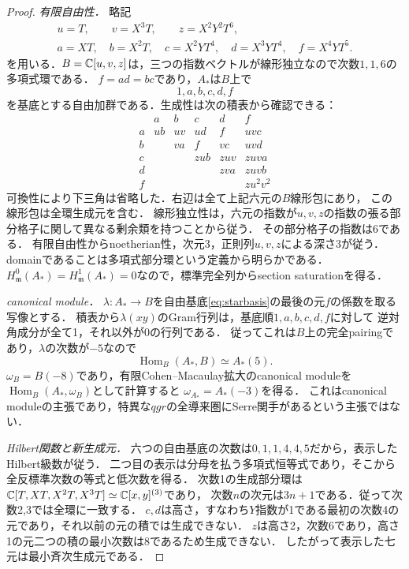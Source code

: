 \documentclass[11pt,a4paper]{ltjsarticle}
\begin{document}
\begin{proof}
\emph{有限自由性．}
略記
\[
 \begin{gathered}
 u=T,\qquad v=X^3T,\qquad z=X^2Y^2T^6,\\
 a=XT,\quad b=X^2T,\quad c=X^2YT^4,\quad d=X^3YT^4,\quad f=X^4YT^5.
 \end{gathered}
\]
を用いる．$B=\mathbb C[u,v,z]$は，三つの指数ベクトルが線形独立なので次数$1,1,6$の多項式環である．
$f=ad=bc$であり，$A_*$は$B$上で
\begin{equation}\label{eq:starbasis}
 1,a,b,c,d,f
\end{equation}
を基底とする自由加群である．生成性は次の積表から確認できる：
\[
\begin{array}{c|ccccc}
 &a&b&c&d&f\\\hline
 a&ub&uv&ud&f&uvc\\
 b&&va&f&vc&uvd\\
 c&&&zub&zuv&zuva\\
 d&&&&zva&zuvb\\
 f&&&&&zu^2v^2
\end{array}
\]
可換性により下三角は省略した．右辺は全て上記六元の$B$線形包にあり，
この線形包は全環生成元を含む．
線形独立性は，六元の指数が$u,v,z$の指数の張る部分格子に関して異なる剰余類を持つことから従う．
その部分格子の指数は6である．
有限自由性からnoetherian性，次元3，正則列$u,v,z$による深さ3が従う．
domainであることは多項式部分環という定義から明らかである．
$H^0_{\mathfrak m}(A_*)=H^1_{\mathfrak m}(A_*)=0$なので，標準完全列からsection saturationを得る．

\emph{canonical module．}
$\lambda:A_*\to B$を自由基底\eqref{eq:starbasis}の最後の元$f$の係数を取る写像とする．
積表から$\lambda(xy)$のGram行列は，基底順$1,a,b,c,d,f$に対して
逆対角成分が全て1，それ以外が0の行列である．
従ってこれは$B$上の完全pairingであり，$\lambda$の次数が$-5$なので
\[
 \operatorname{Hom}_B(A_*,B)\simeq A_*(5).
\]
$\omega_B=B(-8)$であり，有限Cohen--Macaulay拡大のcanonical moduleを
$\operatorname{Hom}_B(A_*,\omega_B)$として計算すると
$\omega_{A_*}=A_*(-3)$を得る．
これはcanonical moduleの主張であり，特異な$qgr$の全導来圏にSerre関手があるという主張ではない．

\emph{Hilbert関数と新生成元．}
六つの自由基底の次数は$0,1,1,4,4,5$だから，表示したHilbert級数が従う．
二つ目の表示は分母を払う多項式恒等式であり，そこから全反標準次数の等式と低次数を得る．
次数1の生成部分環は$\mathbb C[T,XT,X^2T,X^3T]\simeq\mathbb C[x,y]^{(3)}$であり，
次数$n$の次元は$3n+1$である．従って次数2,3では全環に一致する．
$c,d$は高さ，すなわち$Y$指数が1である最初の次数4の元であり，それ以前の元の積では生成できない．
$z$は高さ2，次数6であり，高さ1の元二つの積の最小次数は8であるため生成できない．
したがって表示した七元は最小斉次生成元である．


\end{proof}
\end{document}
